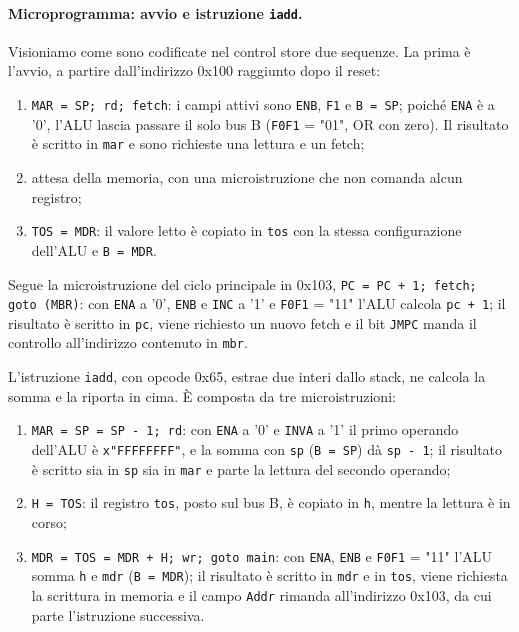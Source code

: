 \paragraph{Microprogramma: avvio e istruzione \texttt{iadd}.}
Visioniamo come sono codificate nel control store due sequenze. La prima è l'avvio, a partire dall'indirizzo 0x100 raggiunto dopo il reset:
\begin{enumerate}
  \item \texttt{MAR = SP; rd; fetch}: i campi attivi sono \texttt{ENB}, \texttt{F1} e \texttt{B = SP}; poiché \texttt{ENA} è a '0', l'ALU lascia passare il solo bus B (\texttt{F0F1} = "01", OR con zero). Il risultato è scritto in \texttt{mar} e sono richieste una lettura e un fetch;
  \item attesa della memoria, con una microistruzione che non comanda alcun registro;
  \item \texttt{TOS = MDR}: il valore letto è copiato in \texttt{tos} con la stessa configurazione dell'ALU e \texttt{B = MDR}.
\end{enumerate}
Segue la microistruzione del ciclo principale in 0x103, \texttt{PC = PC + 1; fetch; goto (MBR)}: con \texttt{ENA} a '0', \texttt{ENB} e \texttt{INC} a '1' e \texttt{F0F1} = "11" l'ALU calcola \texttt{pc + 1}; il risultato è scritto in \texttt{pc}, viene richiesto un nuovo fetch e il bit \texttt{JMPC} manda il controllo all'indirizzo contenuto in \texttt{mbr}.

L'istruzione \texttt{iadd}, con opcode 0x65, estrae due interi dallo stack, ne calcola la somma e la riporta in cima. È composta da tre microistruzioni:
\begin{enumerate}
  \item \texttt{MAR = SP = SP - 1; rd}: con \texttt{ENA} a '0' e \texttt{INVA} a '1' il primo operando dell'ALU è \texttt{x"FFFFFFFF"}, e la somma con \texttt{sp} (\texttt{B = SP}) dà \texttt{sp - 1}; il risultato è scritto sia in \texttt{sp} sia in \texttt{mar} e parte la lettura del secondo operando;
  \item \texttt{H = TOS}: il registro \texttt{tos}, posto sul bus B, è copiato in \texttt{h}, mentre la lettura è in corso;
  \item \texttt{MDR = TOS = MDR + H; wr; goto main}: con \texttt{ENA}, \texttt{ENB} e \texttt{F0F1} = "11" l'ALU somma \texttt{h} e \texttt{mdr} (\texttt{B = MDR}); il risultato è scritto in \texttt{mdr} e in \texttt{tos}, viene richiesta la scrittura in memoria e il campo \texttt{Addr} rimanda all'indirizzo 0x103, da cui parte l'istruzione successiva.
\end{enumerate}
